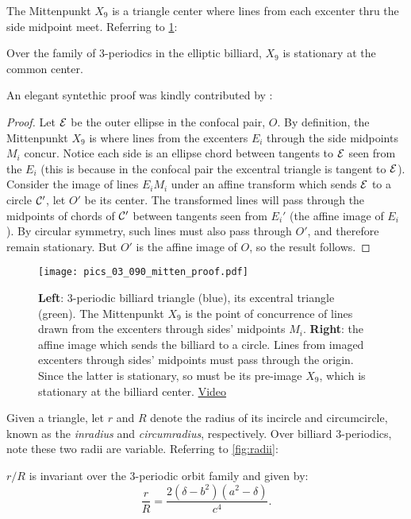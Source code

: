 The Mittenpunkt $X_9$ is a triangle center where lines from each excenter thru the side midpoint meet. Referring to \cref{fig:03-x9}:
\begin{theorem}
Over the family of 3-periodics in the elliptic billiard, $X_9$ is stationary at the common center.
\end{theorem}

An elegant syntethic proof was kindly contributed by \cite{olga19_mitten}:

\begin{proof}
Let $\mathcal{E}$ be the outer ellipse in the confocal pair, $O$. By definition, the Mittenpunkt $X_9$ is where lines from the excenters $E_i$ through the side midpoints $M_i$ concur. Notice each side is an ellipse chord between tangents to $\mathcal{E}$ seen from the $E_i$ (this is because in the confocal pair the excentral triangle is tangent to $\mathcal{E}$). Consider the image of lines $E_i M_i$ under an affine transform which sends $\mathcal{E}$ to a circle $\mathcal{C}'$, let $O'$ be its center. The transformed lines will pass through the midpoints of chords of $\mathcal{C}'$ between tangents seen from $E_i'$ (the affine image of $E_i$). By circular symmetry, such lines must also pass through $O'$, and therefore remain stationary. But $O'$ is the affine image of $O$, so the result follows.
\end{proof}

\begin{figure}
     \centering
    \texttt{[image: pics\_03\_090\_mitten\_proof.pdf]}
     \caption{\textbf{Left}: 3-periodic billiard triangle (blue), its excentral triangle (green). The Mittenpunkt $X_9$ is the point of concurrence of lines drawn from the excenters through sides' midpoints $M_i$. \textbf{Right}: the affine image which sends the billiard to a circle. Lines from imaged excenters through sides' midpoints must pass through the origin. Since the latter is stationary, so must be its pre-image $X_9$, which is stationary at the billiard center.  %
     \href{https://youtu.be/tMrBqfRBYik}{Video}}
     \label{fig:03-x9} 
\end{figure}

Given a triangle, let $r$ and $R$ denote the radius of its incircle and circumcircle, known as the {\em inradius} and {\em circumradius}, respectively. Over billiard 3-periodics, note these two radii are variable. Referring to \cref{fig:radii}:

\begin{theorem}
$r/R$ is invariant over the 3-periodic orbit family and given by:
\begin{equation*}
\label{eqn:rovR}
\frac{r}{R}=\frac{2 (\delta-b^2)(a^2-\delta)}{c^4}.
\end{equation*}
\label{thm:03-confocal-rovR}
\end{theorem}

